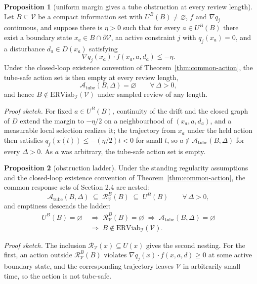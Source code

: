 \documentclass[10pt,twocolumn]{article}
\theoremstyle{definition}
\newtheorem{proposition}{Proposition}
\begin{document}
\begin{proposition}[uniform margin gives a tube obstruction at every review length]\label{prop:uniform-margin}
Let \(B\subseteq\mathcal V\) be a compact information set with
\(U^B(B)\neq\varnothing\), \(f\) and \(\nabla q_j\) continuous, and
suppose there is \(\eta>0\) such that for every \(a\in U^B(B)\) there
exist a boundary state \(x_a\in B\cap\partial\mathcal V\), an active
constraint \(j\) with \(q_j(x_a)=0\), and a disturbance \(d_a\in D(x_a)\)
satisfying
\[\nabla q_j(x_a)\cdot f(x_a,a,d_a) \le -\eta.\]
Under the closed-loop existence convention of
Theorem~\ref{thm:common-action}, the tube-safe action set is then empty
at every review length,
\[\mathcal{A}_{\mathrm{tube}}(B,\Delta)=\varnothing \qquad \forall\,\Delta>0,\]
and hence \(B\notin\mathrm{ERViab}_{\mathcal I}(\mathcal V)\) under
sampled review of any length.
\end{proposition}

\emph{Proof sketch.} For fixed \(a \in U^B(B)\), continuity of the drift and the closed graph of \(D\) extend the margin to \(-\eta/2\) on a neighbourhood of \((x_a, a, d_a)\), and a measurable local selection realizes it; the trajectory from \(x_a\) under the held action then satisfies \(q_j(x(t)) \le -(\eta/2) t < 0\) for small \(t\), so \(a \notin \mathcal{A}_{\mathrm{tube}}(B, \Delta)\) for every \(\Delta > 0\). As \(a\) was arbitrary, the tube-safe action set is empty.

\begin{proposition}[obstruction ladder]\label{prop:ladder}
Under the standing regularity assumptions and the closed-loop existence
convention of Theorem~\ref{thm:common-action}, the common response sets
of Section 2.4 are nested:
\[\mathcal{A}_{\mathrm{tube}}(B,\Delta) \;\subseteq\; \mathcal{R}_{\mathcal{V}}^B(B) \;\subseteq\; U^B(B) \qquad \forall\,\Delta>0,\]
and emptiness descends the ladder:
\[
\begin{aligned}
U^B(B)=\varnothing \;&\Longrightarrow\; \mathcal{R}_{\mathcal{V}}^B(B)=\varnothing \;\Longrightarrow\; \mathcal{A}_{\mathrm{tube}}(B,\Delta)=\varnothing \\
&\Longrightarrow\; B\notin\mathrm{ERViab}_{\mathcal{I}}(\mathcal{V}).
\end{aligned}
\]
\end{proposition}

\emph{Proof sketch.} The inclusion \(\mathcal{R}_{\mathcal{V}}(x) \subseteq U(x)\) gives the second nesting. For the first, an action outside \(\mathcal{R}_{\mathcal{V}}^B(B)\) violates \(\nabla q_j(x) \cdot f(x, a, d) \ge 0\) at some active boundary state, and the corresponding trajectory leaves \(\mathcal{V}\) in arbitrarily small time, so the action is not tube-safe.
\end{document}
